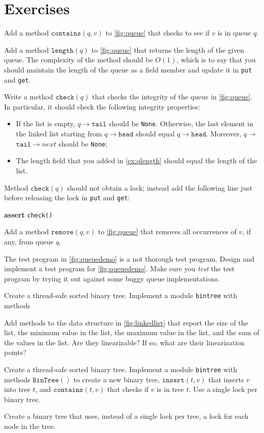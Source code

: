 \documentclass{report}
\newenvironment{code}{
\tcolorbox
}{
\endtcolorbox
}
\begin{document}
\section*{Exercises}
\begin{problems}
\item \label{ex:qcontains} Add a method $\mathtt{contains}(q, v)$ to \autoref{fig:queue}
that checks to see if $v$ is in queue $q$.
\item Add a method $\mathtt{length}(q)$ to \autoref{fig:queue} that returns the length of the given queue.
The complexity of the method should be $O(1)$, which is to say that you should maintain
the length of the queue as a field member and update it in \texttt{put} and \texttt{get}.
\item \label{ex:qlength} Write a method $\mathtt{check}(q)$
that checks the integrity of the queue in \autoref{fig:queue}.
In particular, it should check the following integrity properties:
\begin{itemize}
\item If the list is empty, $q$$\rightarrow$$\mathtt{tail}$ should be \texttt{None}.
Otherwise, the last element in the linked list starting from $q$$\rightarrow$$\mathtt{head}$
should equal $q$$\rightarrow$$\mathtt{head}$. Moreover,
$q$$\rightarrow$$\texttt{tail}$$\rightarrow$$next$ should be \texttt{None};
\item The length field that you added in \autoref{ex:qlength} should equal the length
of the list.
\end{itemize}
Method $\mathtt{check}(q)$ should not obtain a lock; instead add the following line
just before releasing the lock in \texttt{put} and \texttt{get}:
\begin{code}
\textbf{assert} \texttt{check()}
\end{code}
\item \label{ex:qremove} Add a method $\mathtt{remove}(q, v)$ to \autoref{fig:queue}
that removes all occurrences of $v$, if any, from queue $q$.
\item The test program in \autoref{fig:queuedemo} is a not thorough test program.
Design and implement a test program for \autoref{fig:queuedemo}.
Make sure you \emph{test} the test program by trying it out against some buggy
queue implementations.
\item Create a thread-safe sorted binary tree.  Implement a module
\texttt{bintree} with methods
\item Add methods to the data structure in \autoref{fig:linkedlist}
that report the size of the list, the minimum value in the
list, the maximum value in the list, and the sum of the values in the list.
Are they linearizable?  If so, what are their linearization points?
\item Create a thread-safe sorted binary tree.  Implement a module \texttt{bintree}
with methods
$\mathtt{BinTree}()$ to create a new binary tree, $\mathtt{insert}(t, v)$ that inserts $v$ into
tree $t$, and $\mathtt{contains}(t, v)$ that checks if $v$ is in tree $t$.  Use a single
lock per binary tree.
\item Create a binary tree that uses, instead of a single lock per tree,
a lock for each node in the tree.
\end{problems}
\end{document}
